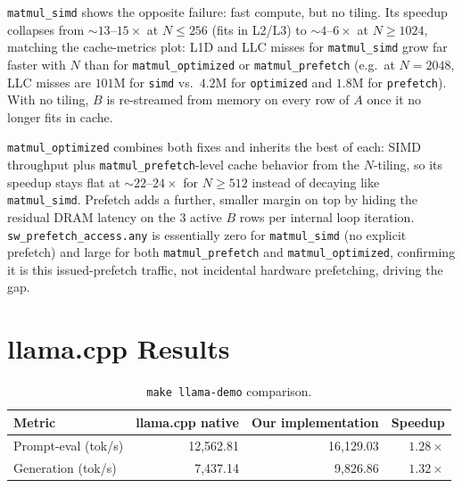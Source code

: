 \documentclass[11pt]{article}
\begin{document}
\texttt{matmul\_simd} shows the opposite failure: fast compute, but no tiling. Its speedup collapses from $\sim 13$--$15\times$ at $N
\le 256$ (fits in L2/L3) to $\sim 4$--$6\times$ at $N \ge 1024$, matching the
cache-metrics plot: L1D and LLC misses for \texttt{matmul\_simd} grow far faster
with $N$ than for \texttt{matmul\_optimized} or \texttt{matmul\_prefetch} (e.g.\
at $N{=}2048$, LLC misses are $101$M for \texttt{simd} vs.\ $4.2$M for
\texttt{optimized} and $1.8$M for \texttt{prefetch}). With no tiling, $B$ is
re-streamed from memory on every row of $A$ once it no longer fits in cache.

\texttt{matmul\_optimized} combines both fixes and inherits the best of each:
SIMD throughput plus \texttt{matmul\_prefetch}-level cache
behavior from the $N$-tiling, so its speedup stays flat at $\sim 22$--$24\times$
for $N \ge 512$ instead of decaying like \texttt{matmul\_simd}. Prefetch adds a
further, smaller margin on top by hiding the residual DRAM latency on the 3
active $B$ rows per internal loop iteration. \texttt{sw\_prefetch\_access.any} is
essentially zero for \texttt{matmul\_simd} (no explicit prefetch) and large for
both \texttt{matmul\_prefetch} and \texttt{matmul\_optimized}, confirming it is
this issued-prefetch traffic, not incidental hardware prefetching, driving the
gap.

\section{llama.cpp Results}


\begin{table}[H]
    \centering
    \begin{tabular}{lrrr}
        \toprule
        \textbf{Metric} & \textbf{llama.cpp native} & \textbf{Our implementation} & \textbf{Speedup} \\
        \midrule
        Prompt-eval (tok/s) & 12{,}562.81 & 16{,}129.03 & $1.28\times$ \\
        Generation (tok/s)  & 7{,}437.14  & 9{,}826.86  & $1.32\times$ \\
        \bottomrule
    \end{tabular}
    \caption{\texttt{make llama-demo} comparison.}
    \label{tab:t2-llama}
\end{table}
\end{document}
